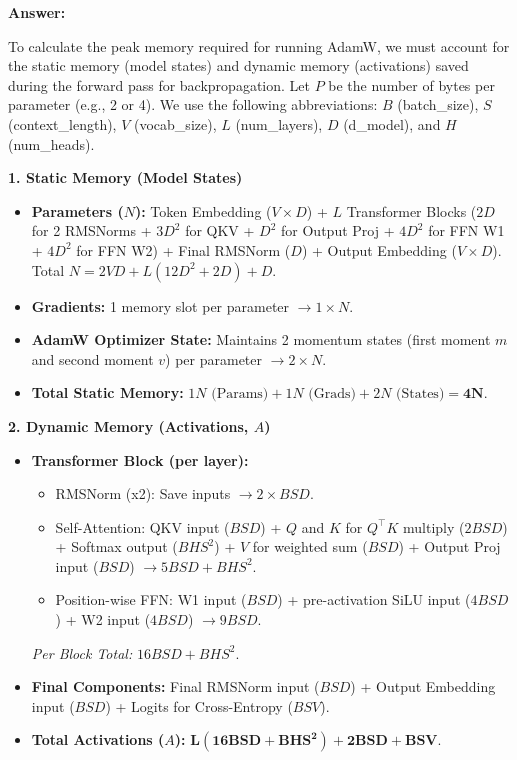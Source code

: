 \begin{answerbox}
    \textbf{Answer:}

    To calculate the peak memory required for running AdamW, we must account for the static memory (model states) and dynamic memory (activations) saved during the forward pass for backpropagation. Let $P$ be the number of bytes per parameter (e.g., 2 or 4). We use the following abbreviations: $B$ (batch\_size), $S$ (context\_length), $V$ (vocab\_size), $L$ (num\_layers), $D$ (d\_model), and $H$ (num\_heads).

    \textbf{1. Static Memory (Model States)}
    \begin{itemize}
        \item \textbf{Parameters ($N$):} Token Embedding ($V \times D$) + $L$ Transformer Blocks ($2D$ for 2 RMSNorms + $3D^2$ for QKV + $D^2$ for Output Proj + $4D^2$ for FFN W1 + $4D^2$ for FFN W2) + Final RMSNorm ($D$) + Output Embedding ($V \times D$). \\
              Total $N = 2VD + L(12D^2 + 2D) + D$.
        \item \textbf{Gradients:} 1 memory slot per parameter $\rightarrow 1 \times N$.
        \item \textbf{AdamW Optimizer State:} Maintains 2 momentum states (first moment $m$ and second moment $v$) per parameter $\rightarrow 2 \times N$.
        \item \textbf{Total Static Memory:} $1N \text{ (Params)} + 1N \text{ (Grads)} + 2N \text{ (States)} = \mathbf{4N}$.
    \end{itemize}

    \textbf{2. Dynamic Memory (Activations, $A$)}
    \begin{itemize}
        \item \textbf{Transformer Block (per layer):}
              \begin{itemize}
                  \item RMSNorm (x2): Save inputs $\rightarrow 2 \times BSD$.
                  \item Self-Attention: QKV input ($BSD$) + $Q$ and $K$ for $Q^\top K$ multiply ($2BSD$) + Softmax output ($BHS^2$) + $V$ for weighted sum ($BSD$) + Output Proj input ($BSD$) $\rightarrow 5BSD + BHS^2$.
                  \item Position-wise FFN: W1 input ($BSD$) + pre-activation SiLU input ($4BSD$) + W2 input ($4BSD$) $\rightarrow 9BSD$.
              \end{itemize}
              \textit{Per Block Total:} $16BSD + BHS^2$.
        \item \textbf{Final Components:} Final RMSNorm input ($BSD$) + Output Embedding input ($BSD$) + Logits for Cross-Entropy ($BSV$).
        \item \textbf{Total Activations ($A$):} $\mathbf{L(16BSD + BHS^2) + 2BSD + BSV}$.
    \end{itemize}


\end{answerbox}
